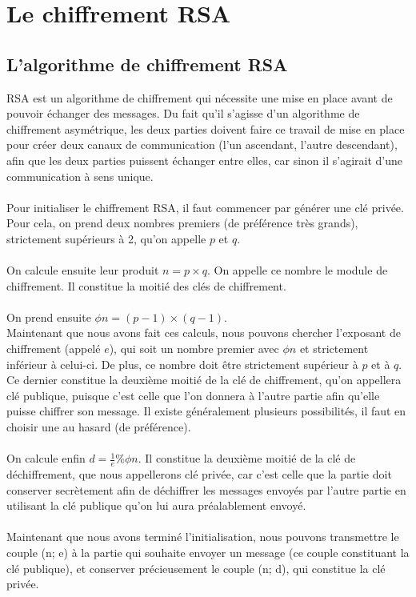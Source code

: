 \chapter{Le chiffrement RSA}
	\section{L'algorithme de chiffrement RSA}
		RSA est un algorithme de chiffrement qui nécessite une mise en place avant de pouvoir échanger des messages. Du fait qu'il s'agisse d'un algorithme de chiffrement asymétrique, les deux parties doivent faire ce travail de mise en place pour créer deux canaux de communication (l'un ascendant, l'autre descendant), afin que les deux parties puissent échanger entre elles, car sinon il s'agirait d'une communication à sens unique.\\
		\\
		Pour initialiser le chiffrement RSA, il faut commencer par générer une clé privée. Pour cela, on prend deux nombres premiers (de préférence très grands), strictement supérieurs à 2, qu'on appelle $p$ et $q$.\\
		\\
		On calcule ensuite leur produit $n = p \times q$. On appelle ce nombre le module de chiffrement. Il constitue la moitié des clés de chiffrement.\\
		\\
		On prend ensuite $\phi{n} = (p - 1) \times (q - 1)$.\\
		Maintenant que nous avons fait ces calculs, nous pouvons chercher l'exposant de chiffrement (appelé $e$), qui soit un nombre premier avec $\phi{n}$ et strictement inférieur à celui-ci. De plus, ce nombre doit être strictement supérieur à $p$ et à $q$. Ce dernier constitue la deuxième moitié de la clé de chiffrement, qu'on appellera clé publique, puisque c'est celle que l'on donnera à l'autre partie afin qu'elle puisse chiffrer son message. Il existe généralement plusieurs possibilités, il faut en choisir une au hasard (de préférence).\\
		\\
		On calcule enfin $d = \frac{1}{e} \% \phi{n}$. Il constitue la deuxième moitié de la clé de déchiffrement, que nous appellerons clé privée, car c'est celle que la partie doit conserver secrètement afin de déchiffrer les messages envoyés par l'autre partie en utilisant la clé publique qu'on lui aura préalablement envoyé.\\
		\\
		Maintenant que nous avons terminé l'initialisation, nous pouvons transmettre le couple (n; e) à la partie qui souhaite envoyer un message (ce couple constituant la clé publique), et conserver précieusement le couple (n; d), qui constitue la clé privée.\\
